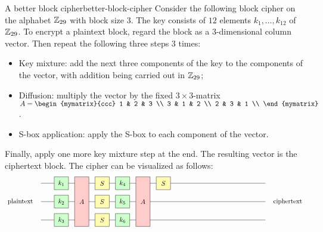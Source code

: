 \begin{definition}{A better block cipher}{better-block-cipher}
  Consider the following block cipher on the alphabet $\mathbb{Z}_{29}$ with
  block size 3. The key consists of $12$ elements $k_1,\ldots,k_{12}$
  of $\mathbb{Z}_{29}$. To encrypt a plaintext block, regard the block as a
  3-dimensional column vector. Then repeat the following three steps
  $3$ times:
  \begin{itemize}
  \item Key mixture: add the next three components of the key to the
    components of the vector, with addition being carried out in $\mathbb{Z}_{29}$;
  \item Diffusion: multiply the vector by the fixed $3\times 3$-matrix
    $A = \begin{mymatrix}{ccc}
      1 & 2 & 3 \\
      3 & 1 & 2 \\
      2 & 3 & 1 \\
    \end{mymatrix}$.
  \item S-box application: apply the S-box to each component of the
    vector.
  \end{itemize}
  Finally, apply one more key mixture step at the end. The resulting
  vector is the ciphertext block. The cipher can be visualized as
  follows:
  \begin{equation*}
    \begin{tikzpicture}[xscale=1.1,
      a/.style={fill=red!20},
      s/.style={fill=yellow!30},
      k/.style={fill=green!20}]
      \draw (0,2) -- (11,2);
      \draw (0,1) node[left=2ex]{plaintext} -- (11,1) node[right=2ex]{ciphertext};
      \draw (0,0) -- (11,0);
      \draw[k] (1,2) +(-0.35,-0.35) rectangle node{$k_{1}$} +(0.35,0.35);
      \draw[k] (1,1) +(-0.35,-0.35) rectangle node{$k_{2}$} +(0.35,0.35);
      \draw[k] (1,0) +(-0.35,-0.35) rectangle node{$k_{3}$} +(0.35,0.35);
      \draw[a] (2,0) +(-0.35,-0.35) rectangle node{$A$} +(0.35,2.35);
      \draw[s] (3,2) +(-0.35,-0.35) rectangle node{$S$} +(0.35,0.35);
      \draw[s] (3,1) +(-0.35,-0.35) rectangle node{$S$} +(0.35,0.35);
      \draw[s] (3,0) +(-0.35,-0.35) rectangle node{$S$} +(0.35,0.35);
      \draw[k] (4,2) +(-0.35,-0.35) rectangle node{$k_{4}$} +(0.35,0.35);
      \draw[k] (4,1) +(-0.35,-0.35) rectangle node{$k_{5}$} +(0.35,0.35);
      \draw[k] (4,0) +(-0.35,-0.35) rectangle node{$k_{6}$} +(0.35,0.35);
      \draw[a] (5,0) +(-0.35,-0.35) rectangle node{$A$} +(0.35,2.35);
      \draw[s] (6,2) +(-0.35,-0.35) rectangle node{$S$} +(0.35,0.35);

\end{tikzpicture}
\end{equation*}
\end{definition}
